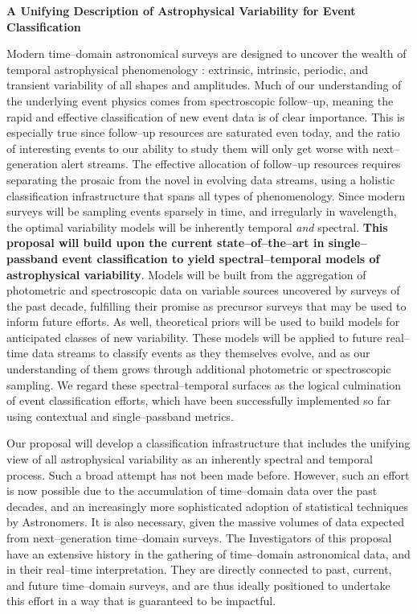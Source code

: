 \centerline{\bf A Unifying Description of Astrophysical Variability for Event
Classification} \medskip

Modern time--domain astronomical surveys are designed to uncover the wealth of
temporal astrophysical phenomenology : extrinsic, intrinsic, periodic, and
transient variability of all shapes and amplitudes.  Much of our understanding
of the underlying event physics comes from spectroscopic follow--up, meaning the
rapid and effective classification of new event data is of clear importance.
This is especially true since follow--up resources are saturated even today, and
the ratio of interesting events to our ability to study them will only get worse
with next--generation alert streams. The effective allocation of follow--up
resources requires separating the prosaic from the novel in evolving data
streams, using a holistic classification infrastructure that spans all types of
phenomenology. Since modern surveys will be sampling events sparsely in time,
and irregularly in wavelength, the optimal variability models will be inherently
temporal {\it and} spectral.  {\bf This proposal will build upon the current
state--of--the--art in single--passband event classification to yield
spectral--temporal models of astrophysical variability}.  Models will be built
from the aggregation of photometric and spectroscopic data on variable sources
uncovered by surveys of the past decade, fulfilling their promise as precursor
surveys that may be used to inform future efforts.  As well, theoretical priors
will be used to build models for anticipated classes of new variability.  These
models will be applied to future real--time data streams to classify events as
they themselves evolve, and as our understanding of them grows through
additional photometric or spectroscopic sampling.  We regard these
spectral--temporal surfaces as the logical culmination of event classification
efforts, which have been successfully implemented so far using contextual and
single--passband metrics.

\bigskip \centerline{}

Our proposal will develop a classification infrastructure that includes the
unifying view of all astrophysical variability as an inherently spectral and
temporal process.  Such a broad attempt has not been made before. However, such
an effort is now possible due to the accumulation of time--domain data over the
past decades, and an increasingly more sophisticated adoption of statistical
techniques by Astronomers. It is also necessary, given the massive volumes of
data expected from next--generation time--domain surveys. The Investigators of
this proposal have an extensive history in the gathering of time--domain
astronomical data, and in their real--time interpretation.  They are directly
connected to past, current, and future time--domain surveys, and are thus
ideally positioned to undertake this effort in a way that is guaranteed to be
impactful.

